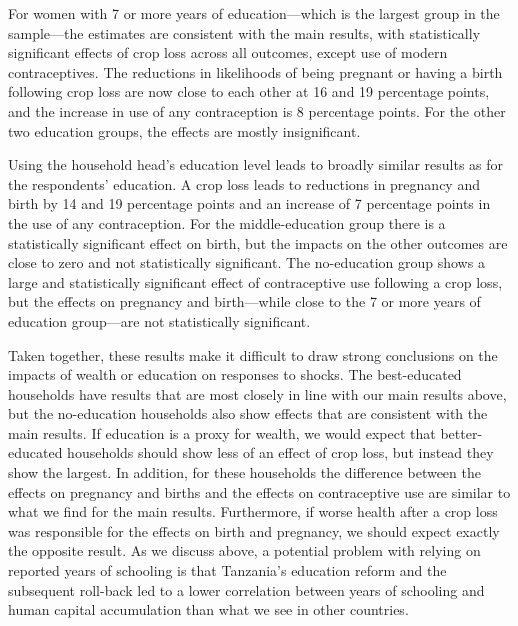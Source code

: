 \documentclass[letterpaper,12pt]{article}
\begin{document}



For women with 7 or more years of education---which is the largest
group in the sample---the estimates are consistent with the 
main results, with statistically significant effects of crop loss 
across all outcomes, except use of modern contraceptives.
The reductions in likelihoods of being pregnant or having a birth
following crop loss are now close to each other at 16 and 19 percentage
points, and the increase in use of any contraception is 8 percentage
points.
For the other two education groups, the effects are mostly insignificant.

Using the household head's education level leads to broadly 
similar results as for the respondents' education. 
A crop loss leads to reductions in pregnancy and birth by
14 and 19 percentage points and an increase of 7 percentage points
in the use of any contraception.
For the middle-education group there is a statistically significant
effect on birth, but the impacts on the other outcomes are close to zero and
not statistically significant.
The no-education group shows a large and statistically significant
effect of contraceptive use following a crop loss, but the
effects on pregnancy and birth---while close to the 7 or more 
years of education group---are not statistically significant.

Taken together, these results make it difficult to draw strong
conclusions on the impacts of wealth or education on responses to shocks.
The best-educated households have results that are
most closely in line with our main results above, but 
the no-education households also show effects that are
consistent with the main results.
If education is a proxy for wealth, we would 
expect that better-educated households should show less
of an effect of crop loss, but instead they show the largest.
In addition, for these households the difference between
the effects on pregnancy and births and the effects on
contraceptive use are similar to what we find for the main results.
Furthermore, if worse health after a crop loss was responsible for the
effects on birth and pregnancy, we should expect exactly
the opposite result.
As we discuss above, a potential problem with relying on 
reported years of schooling is that Tanzania's education reform and the
subsequent roll-back led to a lower correlation between years of
schooling and human capital accumulation than what we see in other
countries.
\end{document}
